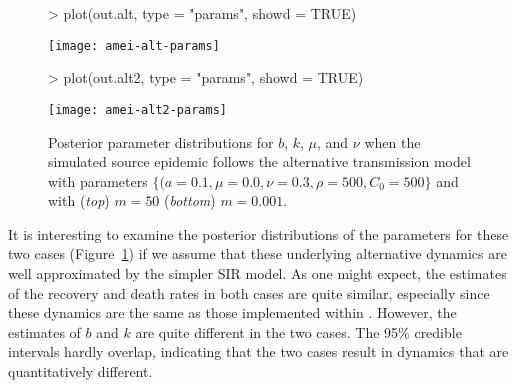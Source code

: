 \documentclass[shortnames,nojss]{jss}
\begin{document}
\begin{figure}[ht!]
\begin{Schunk}
\begin{Sinput}
> plot(out.alt, type = "params", showd = TRUE)
\end{Sinput}
\end{Schunk}
\centering
\texttt{[image: amei-alt-params]}
\begin{Schunk}
\begin{Sinput}
> plot(out.alt2, type = "params", showd = TRUE)
\end{Sinput}
\end{Schunk}
\centering
\texttt{[image: amei-alt2-params]}
\caption{Posterior parameter distributions for $b$, $k$, $\mu$, and
  $\nu$ when the simulated source epidemic follows the alternative
  transmission model with parameters $\{(a=0.1, \mu=0.0, \nu=0.3,
  \rho=500, C_0=500\}$ and with ({\em top}) $m=50$ ({\em bottom}) $m=0.001$. }
\label{f:alt-params}
\end{figure} 

It is interesting to examine the posterior distributions of the
parameters for these two cases (Figure~\ref{f:alt-params}) if we
assume that these underlying alternative dynamics are well
approximated by the simpler SIR model. As one might expect, the
estimates of the recovery and death rates in both cases are quite
similar, especially since these dynamics are the same as those
implemented within . However, the estimates of $b$ and $k$
are quite different in the two cases.  The 95\% credible intervals
hardly overlap, indicating that the two cases result in dynamics that
are quantitatively different.
\end{document}
